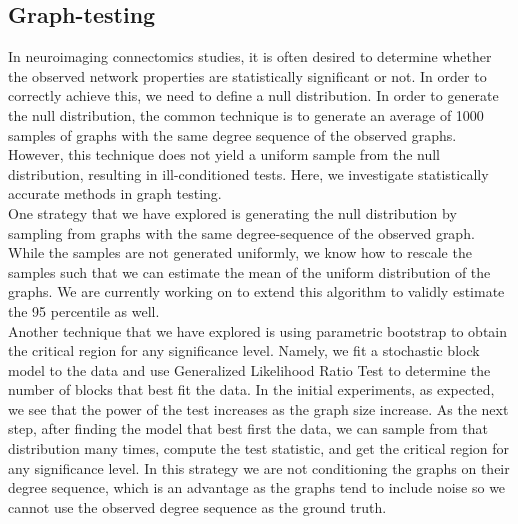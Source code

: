 \documentclass[simplex.tex]{subfiles}
\begin{document}
\subsection{Graph-testing}

In neuroimaging connectomics studies, it is often desired to determine
whether the observed network properties are statistically significant or
not. In order to correctly achieve this, we need to define a null
distribution. In order to generate the null distribution, the common
technique is to  generate an average of 1000 samples of graphs with the
same degree sequence of the observed graphs. However, this technique
does not yield a uniform sample from the null distribution, resulting in
ill-conditioned tests. Here, we investigate statistically accurate
methods in graph testing. \\


One strategy that we have explored is generating the null distribution
by sampling from graphs with the same degree-sequence of the observed
graph. While the samples are not generated uniformly, we know how to
rescale the samples such that we can estimate the mean of the uniform
distribution of the graphs. We are currently working on to extend this
algorithm to validly estimate the 95 percentile as well. \\


Another technique that we have explored is using parametric bootstrap to
obtain the critical region for any significance level. Namely, we fit a
stochastic block model to the data and use Generalized Likelihood Ratio
Test to determine the number of blocks that best fit the data. In the
initial experiments, as expected, we see that the power of the test
increases as the graph size increase. As the next step, after finding
the model that best first the data, we can sample from that distribution
many times, compute the test statistic, and get the critical region for
any significance level. In this strategy we are not conditioning the
graphs on their degree sequence, which is an advantage as the graphs
tend to include noise so we cannot use the observed degree sequence as
the ground truth. 


\clearpage
\end{document}
